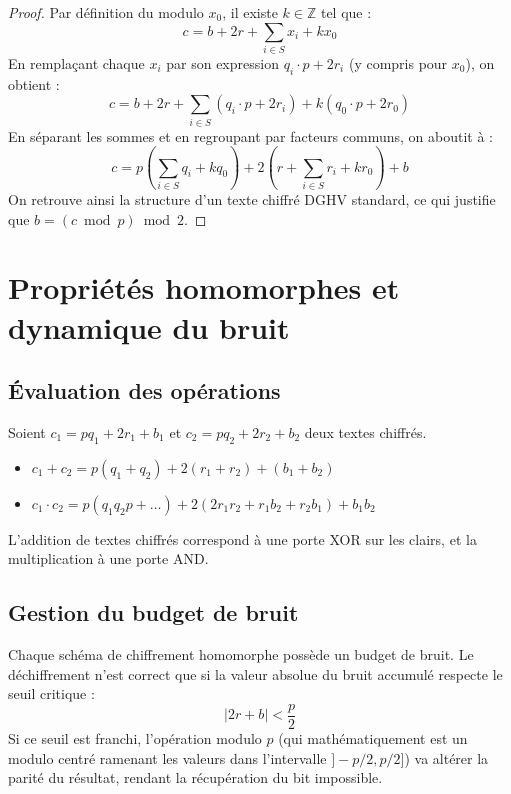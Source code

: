 \begin{proof}
Par définition du modulo $x_0$, il existe $k \in \mathbb{Z}$ tel que :
\[ c = b + 2r + \sum_{i \in S} x_i + kx_0 \]
En remplaçant chaque $x_i$ par son expression $q_i \cdot p + 2r_i$ (y compris pour $x_0$), on obtient :
\[ c = b + 2r + \sum_{i \in S} \left(q_i \cdot p + 2r_i \right) + k(q_0 \cdot p +2r_0) \]
En séparant les sommes et en regroupant par facteurs communs, on aboutit à :
\[ c = p\left(\sum_{i \in S}q_i + kq_0 \right) + 2 \left( r + \sum_{i \in S}r_i + kr_0 \right) + b \]
On retrouve ainsi la structure d'un texte chiffré DGHV standard, ce qui justifie que $b = (c \bmod p) \bmod 2$.
\end{proof}

\section{Propriétés homomorphes et dynamique du bruit}

\subsection{Évaluation des opérations}

\begin{proposition}[Évaluation]
Soient $c_1 = p q_1 + 2r_1 + b_1$ et $c_2 = p q_2 + 2r_2 + b_2$ deux textes chiffrés.
\begin{itemize}
    \item $c_1 + c_2 = p(q_1 + q_2) + 2(r_1 + r_2) + (b_1 + b_2)$
    \item $c_1 \cdot c_2 = p(q_1 q_2 p + \dots) + 2(2r_1 r_2 + r_1 b_2 + r_2 b_1) + b_1 b_2$
\end{itemize}
L'addition de textes chiffrés correspond à une porte XOR sur les clairs, et la multiplication à une porte AND.
\end{proposition}

\subsection{Gestion du budget de bruit}

\begin{definition}
Chaque schéma de chiffrement homomorphe possède un budget de bruit. Le déchiffrement n'est correct que si la valeur absolue du bruit accumulé respecte le seuil critique :
\[ |2r + b| < \frac{p}{2} \]
Si ce seuil est franchi, l'opération modulo $p$ (qui mathématiquement est un modulo centré ramenant les valeurs dans l'intervalle $]-p/2, p/2]$) va altérer la parité du résultat, rendant la récupération du bit impossible.
\end{definition}

